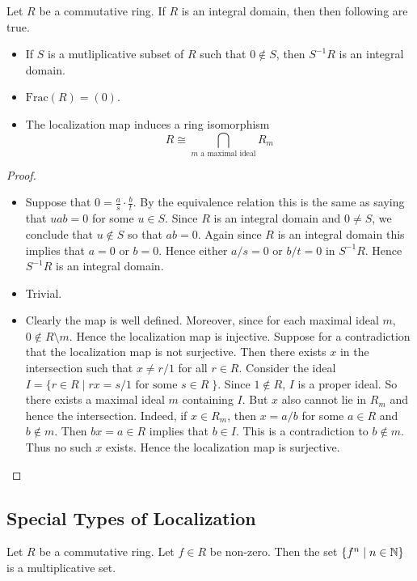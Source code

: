 \documentclass[a4paper]{article}
\begin{document}
\begin{lmm}{}{} Let $R$ be a commutative ring. If $R$ is an integral domain, then then following are true. 
\begin{itemize}
\item If $S$ is a mutliplicative subset of $R$ such that $0\notin S$, then $S^{-1}R$ is an integral domain. 
\item $\text{Frac}(R)=(0)$. 
\item The localization map induces a ring isomorphism $$R\cong\bigcap_{m\text{ a maximal ideal}}R_m$$
\end{itemize} \tcbline
\begin{proof}~\\
\begin{itemize}
\item Suppose that $0=\frac{a}{s}\cdot\frac{b}{t}$. By the equivalence relation this is the same as saying that $uab=0$ for some $u\in S$. Since $R$ is an integral domain and $0\neq S$, we conclude that $u\notin S$ so that $ab=0$. Again since $R$ is an integral domain this implies that $a=0$ or $b=0$. Hence either $a/s=0$ or $b/t=0$ in $S^{-1}R$. Hence $S^{-1}R$ is an integral domain. 
\item Trivial. 
\item Clearly the map is well defined. Moreover, since for each maximal ideal $m$, $0\notin R\setminus m$. Hence the localization map is injective. Suppose for a contradiction that the localization map is not surjective. Then there exists $x$ in the intersection such that $x\neq r/1$ for all $r\in R$.  Consider the ideal $I=\{r\in R\;|\;rx=s/1\text{ for some }s\in R\;\}$. Since $1\notin R$, $I$ is a proper ideal. So there exists a maximal ideal $m$ containing $I$. But $x$ also cannot lie in $R_m$ and hence the intersection. Indeed, if $x\in R_m$, then $x=a/b$ for some $a\in R$ and $b\notin m$. Then $bx=a\in R$ implies that $b\in I$. This is a contradiction to $b\notin m$. Thus no such $x$ exists. Hence the localization map is surjective. 
\end{itemize}
\end{proof}
\end{lmm}

\subsection{Special Types of Localization}
\begin{lmm}{}{} Let $R$ be a commutative ring. Let $f\in R$ be non-zero. Then the set $\{f^n\;|\;n\in\mathbb{N}\}$ is a multiplicative set. 
\end{lmm}
\end{document}
